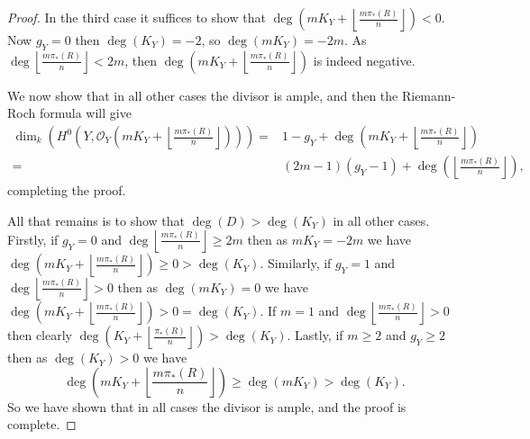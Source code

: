 \documentclass[11pt]{article} %
\begin{document}
\begin{proof}
  In the third case it suffices to show that $\deg \left( mK_Y+\left\lfloor \frac{m\pi_*(R)}{n} \right\rfloor \right) < 0$.
  Now $g_Y=0$ then $\deg(K_Y)=-2$, so $\deg(mK_Y)=-2m$. 
  As $\deg \left\lfloor\frac{m\pi_*(R)}{n} \right\rfloor<2m$, then $\deg \left( mK_Y+\left\lfloor \frac{m\pi_*(R)}{n} \right\rfloor \right)$ is indeed negative.



  We now show that in all other cases the divisor is ample, and then the Riemann-Roch formula will give 
     \begin{eqnarray*}
	\dim_k\left(H^0\left(Y,\mathscr{O}_Y\left(mK_Y+\left\lfloor{\frac{m\pi_*(R)}{n}}\right\rfloor \right)\right)\right)= & 1-g_Y+\deg\left(mK_Y+\left\lfloor{\frac{m\pi_*(R)}{n}}\right\rfloor\right) \\
	= & (2m-1)(g_Y-1)+\deg\left(\left\lfloor{\frac{m\pi_*(R)}{n}}\right\rfloor\right),
      \end{eqnarray*}
  completing the proof.


  All that remains is to show that $\deg(D)>\deg(K_Y)$ in all other cases.
  Firstly, if $g_Y=0$ and $\deg \left\lfloor\frac{m\pi_*(R)}{n} \right\rfloor \geq 2m$ then as $mK_Y=-2m$ we have $\deg \left( mK_Y+\left\lfloor \frac{m\pi_*(R)}{n} \right\rfloor \right) \geq 0 > \deg(K_Y)$.
  Similarly, if $g_Y=1$ and $\deg \left\lfloor\frac{m\pi_*(R)}{n} \right\rfloor >0$ then as $\deg \left( mK_Y \right)=0$ we have $\deg \left( mK_Y+\left\lfloor \frac{m\pi_*(R)}{n} \right\rfloor \right) > 0 = \deg (K_Y)$.
  If $m=1$ and $\deg \left\lfloor\frac{m\pi_*(R)}{n} \right\rfloor >0$ then clearly $\deg \left( K_Y+ \left\lfloor \frac{\pi_*(R)}{n} \right\rfloor \right) > \deg (K_Y)$.
  Lastly, if $m\geq 2$ and $g_Y\geq 2$ then as $\deg (K_Y) > 0$ we have 
    \begin{equation*}
      \deg \left( mK_Y + \left\lfloor \frac{m\pi_*(R)}{n} \right\rfloor \right) \geq \deg\left( mK_Y \right) > \deg (K_Y).
    \end{equation*}
  So we have shown that in all cases the divisor is ample, and the proof is complete.
  \end{proof}
\end{document}
